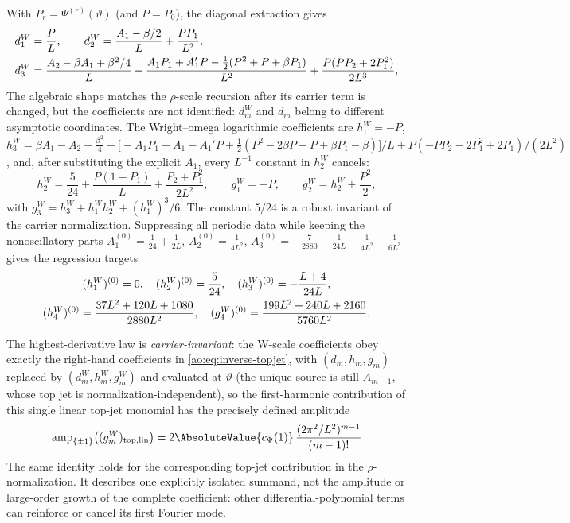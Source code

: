 With $P_r=\Psi^{(r)}(\vartheta)$ (and $P=P_0$), the diagonal
extraction gives
\begin{align}
 d_1^W&=\frac PL,
\qquad
 d_2^W=\frac{A_1-\beta/2}{L}+\frac{PP_1}{L^{2}},
\notag\\
 d_3^W&=\frac{A_2-\beta A_1+\beta^{2}/4}{L}
 +\frac{A_1P_1+A_1'P-\tfrac12(P^{2}+P+\beta P_1)}{L^{2}}
 +\frac{P(PP_2+2P_1^{2})}{2L^{3}},
 \label{ao:eq:W-d123}
\end{align}
The algebraic shape matches the $\rho$-scale recursion after its carrier term
is changed, but the coefficients are not identified: $d_m^W$ and $d_m$ belong
to different asymptotic coordinates.  The Wright--omega logarithmic
coefficients are
$h_1^W=-P$,
$h_3^W=\beta A_1-A_2-\tfrac{\beta^{2}}4
+\bigl[-A_1P_1+A_1-A_1'P
+\tfrac12(P^{2}-2\beta P+P+\beta P_1-\beta)\bigr]/L
+P(-PP_2-2P_1^{2}+2P_1)/(2L^{2})$, and, after substituting the
explicit $A_1$, every $L^{-1}$ constant in $h_2^W$ cancels:
\begin{equation}
 \boxed{\;
 h_2^W=\frac5{24}
 +\frac{P(1-P_1)}{L}
 +\frac{P_2+P_1^{2}}{2L^{2}},
 \qquad
 g_1^W=-P,
\qquad
 g_2^W=h_2^W+\frac{P^{2}}2,
 \;}
 \label{ao:eq:524}
\end{equation}
with $g_3^W=h_3^W+h_1^W h_2^W+(h_1^W)^{3}/6$.  The constant $5/24$ is a robust
invariant of the carrier normalization.  Suppressing all periodic
data while keeping the nonoscillatory parts
$A_1^{(0)}=\tfrac1{24}+\tfrac1{2L}$,
$A_2^{(0)}=\tfrac1{4L^{2}}$,
$A_3^{(0)}=-\tfrac7{2880}-\tfrac1{24L}-\tfrac1{4L^{2}}+\tfrac1{6L^{3}}$
gives the regression targets
\begin{gather}
 (h_1^W)^{(0)}=0,\quad
 (h_2^W)^{(0)}=\frac5{24},\quad
 (h_3^W)^{(0)}=-\frac{L+4}{24L},
\notag\\
 (h_4^W)^{(0)}=\frac{37L^{2}+120L+1080}{2880L^{2}},\quad
 (g_4^W)^{(0)}=\frac{199L^{2}+240L+2160}{5760L^{2}}.
 \label{ao:eq:zero-periodic}
\end{gather}

The highest-derivative law is \emph{carrier-invariant}: the W-scale
coefficients obey exactly
the right-hand coefficients in \eqref{ao:eq:inverse-topjet}, with
$(d_m,h_m,g_m)$ replaced by $(d_m^W,h_m^W,g_m^W)$ and evaluated at
$\vartheta$ (the unique source is still
$A_{m-1}$, whose top jet is normalization-independent), so the
first-harmonic contribution of this single linear top-jet monomial has
the precisely defined amplitude
\begin{equation}
 \operatorname{amp}_{\{\pm1\}}\bigl((g_m^W)_{\mathrm{top,lin}}\bigr)=
 2\AbsoluteValue{\Psihat(1)}\,
 \frac{(2\pi^{2}/L^{2})^{m-1}}{(m-1)!}
 \label{ao:eq:amplitude-law}
\end{equation}
The same identity holds for the corresponding top-jet contribution in the
$\rho$-normalization.  It describes one explicitly isolated summand, not the
amplitude or large-order growth of the complete coefficient: other
differential-polynomial terms can reinforce or cancel its first Fourier mode.

